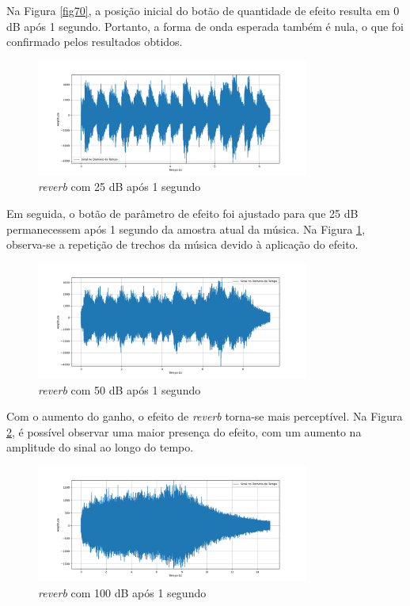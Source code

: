 Na Figura \ref{fig70}, a posição inicial do botão de quantidade de efeito resulta em 0 dB após 1 segundo. Portanto, a forma de onda esperada também é nula, o que foi confirmado pelos resultados obtidos.

\begin{figure}[h]
    \centering
    \includegraphics[width=0.8\textwidth]{figuras/fig71.png}
    \caption{\textit{reverb} com 25 dB após 1 segundo}
    \label{fig71}
\end{figure}

Em seguida, o botão de parâmetro de efeito foi ajustado para que 25 dB permanecessem após 1 segundo da amostra atual da música. Na Figura \ref{fig71}, observa-se a repetição de trechos da música devido à aplicação do efeito.


\newpage
\begin{figure}[h]
    \centering
    \includegraphics[width=0.8\textwidth]{figuras/fig72.png}
    \caption{\textit{reverb} com 50 dB após 1 segundo}
    \label{fig72}
\end{figure}

Com o aumento do ganho, o efeito de \textit{reverb} torna-se mais perceptível. Na Figura \ref{fig72}, é possível observar uma maior presença do efeito, com um aumento na amplitude do sinal ao longo do tempo.

\begin{figure}[h]
    \centering
    \includegraphics[width=0.8\textwidth]{figuras/fig73.png}
    \caption{\textit{reverb} com 100 dB após 1 segundo}
    \label{fig73}
\end{figure}

